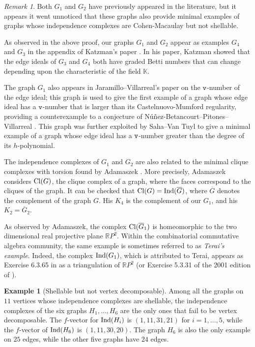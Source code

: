 \documentclass[10pt,a4paper]{amsart}
\theoremstyle{plain}
\theoremstyle{definition}
\newtheorem{example}[theorem]{Example}
\theoremstyle{remark}
\newtheorem{remark}[theorem]{Remark}
\numberwithin{equation}{section}
\numberwithin{equation}{section}
\begin{document}
\begin{remark}
    Both $G_1$ and $G_2$ have previously appeared in the literature,
    but it appears it went unnoticed that
    these graphs also provide minimal examples of graphs
    whose independence complexes are Cohen-Macaulay but not
    shellable.  

    As observed in the above proof,
    our graphs $G_1$ and $G_2$ appear as examples $G_4$ and $G_3$ in the appendix of 
    Katzman's paper \cite{K2006}.    
    In his paper, Katzman showed that the edge ideals of 
    $G_3$ and $G_4$ both have graded Betti numbers
    that can change depending upon the characteristic of the
    field $\mathbb{K}$.  
   
    The graph $G_1$ also appears 
    in Jaramillo--Villarreal's paper
    \cite[Example 5.4]{JV2021} on the ${\tt v}$-number of the
    edge ideal; this graph is used to give the first example
    of a graph whose edge ideal has a
    ${\tt v}$-number that is larger than its
    Castelnuovo-Mumford regularity, providing a counterexample
    to a conjecture of N\'u\~nez-Betancourt--Pitones--Villarreal 
    \cite{NPV2018}.  This graph was further exploited
    by Saha--Van Tuyl \cite[Theorem 3.1]{SVT2026} to give a minimal example
    of a graph whose edge ideal has a
    ${\tt v}$-number greater than the
    degree of its $h$-polynomial.

The  independence complexes of $G_1$ and $G_2$ 
are also related to the minimal clique complexes with torsion found by 
Adamaszek \cite[Theorem 1]{A2014}.   More precisely,
Adamaszek considers
${\rm Cl}(G)$, the clique complex of a graph, where the faces
correspond to the cliques of the graph.  It can be checked
that ${\rm Cl}(G) = {\rm Ind}(\overline{G})$, where $\overline{G}$ denotes
the complement of the graph $G$.  His $K_4$ is the complement of our
$G_1$, and his $K_2 = \overline{G}_2$.

As observed by Adamaszek, the complex ${\rm Cl}(\overline{G}_1)$  
is homeomorphic to the two dimensional 
real projective plane $\mathbb{R}P^2$. Within
the combinatorial commutative algebra community, the same example
is sometimes referred to as {\it Terai's example}.  Indeed, 
the complex ${\rm Ind}(G_1)$, which is attributed to Terai, 
appears as Exercise 6.3.65 in \cite{VBook}
as a triangulation of $\mathbb{R}P^2$ (or Exercise 5.3.31 
of the 2001 edition of \cite{VBook}).
\end{remark}

\begin{example}[Shellable but not vertex decomposable]\label{ex:shellablebutnotvd}
Among all the graphs on $11$ vertices
whose independence complexes are 
shellable, the independence complexes
of the six graphs $H_1,\ldots,H_6$ are the only ones that
fail to
be vertex decomposable.  The $f$-vector 
for ${\rm Ind}(H_i)$ is $(1,11,31,21)$ for $i=1,\ldots,5$,
while the $f$-vector of ${\rm Ind}(H_6)$ is $(1,11,30,20)$.  
The graph $H_6$ is also the only example on $25$ edges,
while the other five graphs have $24$ edges.
\end{example}
\end{document}
